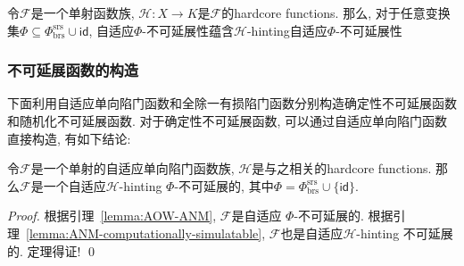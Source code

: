 \begin{lemma}\label{lemma:ANM-computationally-simulatable}
令$\mathcal{F}$是一个单射函数族, $\mathcal{H}: X \rightarrow K$是$\mathcal{F}$的hardcore functions. 那么, 对于任意变换集$\Phi \subseteq \Phi_\text{brs}^\text{srs} \cup \mathsf{id}$, 自适应$\Phi$-不可延展性蕴含$\mathcal{H}$-hinting自适应$\Phi$-不可延展性 
\end{lemma}

\subsubsection{不可延展函数的构造}
下面利用自适应单向陷门函数和全除一有损陷门函数分别构造确定性不可延展函数和随机化不可延展函数. 对于确定性不可延展函数, 可以通过自适应单向陷门函数直接构造, 有如下结论:

\begin{theorem} 
令$\mathcal{F}$是一个单射的自适应单向陷门函数族, $\mathcal{H}$是与之相关的hardcore functions. 那么$\mathcal{F}$是一个自适应$\mathcal{H}$-hinting $\Phi$-不可延展的, 其中$\Phi =  \Phi_\text{brs}^\text{srs} \cup \{\mathsf{id}\}$.  
\end{theorem}

\begin{proof}
根据引理~\ref{lemma:AOW-ANM}, $\mathcal{F}$是自适应 $\Phi$-不可延展的. 根据引理~\ref{lemma:ANM-computationally-simulatable}, $\mathcal{F}$也是自适应$\mathcal{H}$-hinting 不可延展的. 定理得证! \qed  
\end{proof} 

